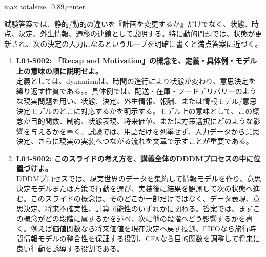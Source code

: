 \begin{minipage}[t]{0.58\textwidth}
\begin{adjustbox}{max totalsize={\textwidth}{0.89\textheight},center}
\begin{minipage}{\textwidth}
試験答案では、静的/動的の違いを『計画を変更するか』だけでなく、状態、時点、決定、外生情報、遷移の連鎖として説明する。特に動的問題では、状態が更新され、次の決定の入力になるというループを明確に書くと満点答案に近づく。\par{}\begin{enumerate}\item \textbf{L04-S002: 「Recap and Motivation」の概念を、定義・具体例・モデル上の意味の順に説明せよ。}\\定義としては、dynamismは、時間の進行により状態が変わり、意思決定を繰り返す性質である。。具体例では、配送・在庫・フードデリバリーのような現実問題を用い、状態、決定、外生情報、報酬、または情報モデル/意思決定モデルのどこに対応するかを明示する。モデル上の意味として、この概念が目的関数、制約、状態表現、将来価値、または方策選択にどのような影響を与えるかを書く。試験では、用語だけを列挙せず、入力データから意思決定、さらに現実の実装へつながる流れを文章で示すことが重要である。\item \textbf{L04-S002: このスライドの考え方を、講義全体のDDDMプロセスの中に位置づけよ。}\\DDDMプロセスでは、現実世界のデータを集約して情報モデルを作り、意思決定モデルまたは方策で行動を選び、実装後に結果を観測して次の状態へ進む。このスライドの概念は、そのどこか一部だけではなく、データ表現、意思決定、将来不確実性、計算可能性のいずれかに関わる。答案では、まずこの概念がどの段階に属するかを述べ、次に他の段階へどう影響するかを書く。例えば価値関数なら将来価値を現在決定へ戻す役割、FIFOなら旅行時間情報モデルの整合性を保証する役割、CFAなら目的関数を調整して将来に良い行動を誘導する役割である。\end{enumerate}
\end{minipage}
\end{adjustbox}
\end{minipage}


